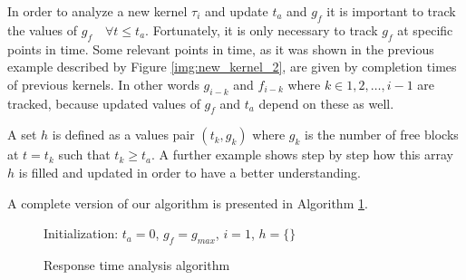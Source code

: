 \documentclass[
  12pt,
  a4paperpaper,
]{report}
\begin{document}
In order to analyze a new kernel \(\tau_i\) and update \(t_a\) and
\(g_f\) it is important to track the values of \(g_f\quad \forall t \leq t_a\).
Fortunately, it is only necessary to track \(g_f\) at specific points in
time. Some relevant points in time, as it was shown in the previous
example described by Figure \ref{img:new_kernel_2}, are given by
completion times of previous kernels. In other words 
\(g_{i-k}\) and \(f_{i-k}\) where \(k \in {1,2,\dots, i-1}\) are tracked, because
updated values of \(g_f\) and \(t_a\) depend on these as well.

A set \(h\) is defined as a values  pair \((t_k, g_k)\) where \(g_k\)
is the number of free blocks at \(t=t_k\) such that \(t_k \geq t_a\).
A further example shows step by step how this array \(h\) is
filled and updated in order to have a better understanding.

A complete version of our algorithm is presented in Algorithm
\ref{alg:full}.

\begin{figure}[ht]
\centering
\begin{minipage}{.7\linewidth}
    \begin{algorithm}[H]
        \DontPrintSemicolon
        \SetAlgoLined
        \Input{$\tau$}
        \BlankLine
        Initialization: $t_a = 0$, $g_f = g_{max}$, $i=1$, $h = \{\}$ \\
        \caption{Response time analysis algorithm }
        \label{alg:full}
    \end{algorithm} 
  \end{minipage}
\end{figure}
\end{document}
